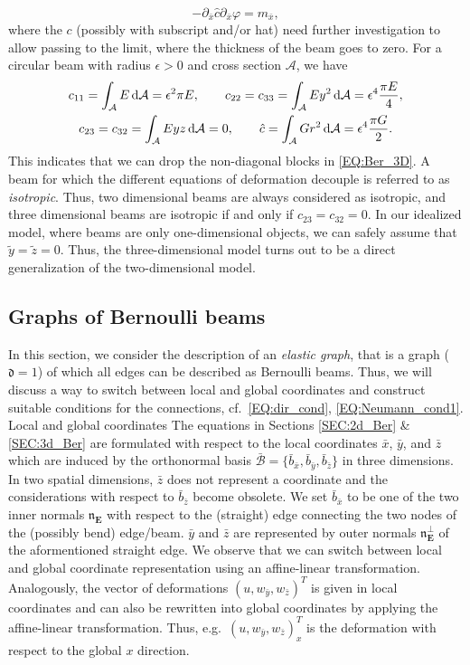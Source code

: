 \documentclass[a4paper, english, 12pt, reqno, draft]{amsart}
\makeatletter
\theoremstyle{definition}
\theoremstyle{remark}
\numberwithin{equation}{section}
\newcommand{\Edge}{{\ensuremath{\boldsymbol E}}}
\newcommand{\locDim}{\ensuremath{\mathfrak d}}
\newcommand{\Normal}{\ensuremath{\mathfrak n_\Edge}}
\newcommand{\NormalOuter}{\ensuremath{\mathfrak n^\perp_\Edge}}
\newcommand{\torsion}{\ensuremath{\varphi}}
\newcommand{\momentum}{\ensuremath{m}}
\newcommand{\crossSect}{\ensuremath{\mathcal A}}
\def\paragraph{\@startsection{paragraph}{4}%
  \z@\z@{-\fontdimen2\font}%
  {\normalfont\scshape}}
\makeatother
\begin{document}
% 
\begin{equation}
 -\partial_{\bar x} \hat c \partial_{\bar x} \torsion = \momentum_{\bar x},
\end{equation}
% 
where the $c$ (possibly with subscript and/or hat) need further investigation to allow passing to the limit, where the thickness of the beam goes to zero. For a circular beam with radius $\epsilon > 0$ and cross section $\crossSect$, we have
% 
\begin{gather*}
 c_{11} = \int_\crossSect E \, \textup d\crossSect = \epsilon^2 \pi E, \qquad c_{22} = c_{33} = \int_\crossSect E y^2 \, \textup d\crossSect = \epsilon^4 \frac{\pi E}{4}, \\
 c_{23} = c_{32} = \int_\crossSect E y z \, \textup d\crossSect = 0, \qquad \hat c = \int_\crossSect G r^2 \, \textup d \crossSect = \epsilon^4 \frac{\pi G}{2}.
\end{gather*}
% 
This indicates that we can drop the non-diagonal blocks in \eqref{EQ:Ber_3D}. A beam for which the different equations of deformation decouple is referred to as \emph{isotropic}. Thus, two dimensional beams are always considered as isotropic, and three dimensional beams are isotropic if and only if $c_{23} = c_{32} = 0$. In our idealized model, where beams are only one-dimensional objects, we can safely assume that $\tilde y = \tilde z = 0$. Thus, the three-dimensional model turns out to be a direct generalization of the two-dimensional model.
% 
\subsection{Graphs of Bernoulli beams}
% 
In this section, we consider the description of an \emph{elastic graph}, that is a graph ($\locDim = 1$) of which all edges can be described as Bernoulli beams. Thus, we will discuss a way to switch between local and global coordinates and construct suitable conditions for the connections, cf.~\eqref{EQ:dir_cond}, \eqref{EQ:Neumann_cond1}.
% 
\paragraph{Local and global coordinates}
% 
The equations in Sections \ref{SEC:2d_Ber} \& \ref{SEC:3d_Ber} are formulated with respect to the local coordinates $\bar x$, $\bar y$, and $\bar z$ which are induced by the orthonormal basis $\bar{\mathcal B} = \{ \bar b_{\bar x}, \bar b_{\bar y}, \bar b_{\bar z}\}$ in three dimensions. In two spatial dimensions, $\bar z$ does not represent a coordinate and the considerations with respect to $\bar b_{\bar z}$ become obsolete. We set 
$\bar b_{\bar x}$ to be one of the two inner normals $\Normal$ with respect to the (straight) edge connecting the two nodes of the (possibly bend) edge/beam. $\bar y$ and $\bar z$ are represented by outer normals $\NormalOuter$ of the aformentioned straight edge. We observe that we can switch between local and global coordinate representation using an affine-linear transformation. Analogously, the vector of deformations $(u, w_{\bar y}, w_{\bar z})^T$ is given in local coordinates and can also be rewritten into global coordinates by applying the affine-linear transformation. Thus, e.g.~$(u, w_{\bar y}, w_{\bar z})^T_x$ is the deformation with respect to the global $x$ direction.
% 
\end{document}
